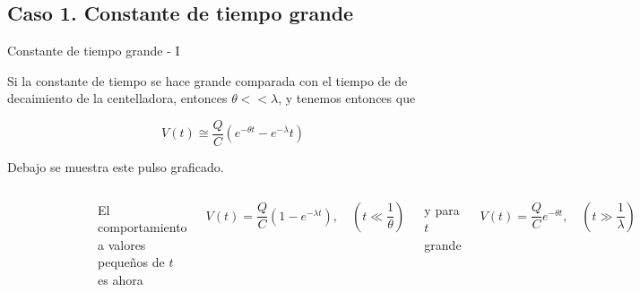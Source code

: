 \documentclass[a4paper,10pt]{beamer}
\begin{document}
\subsection{Caso 1. Constante de tiempo grande}

\begin{frame}{Constante de tiempo grande - I}
 
 Si la constante de tiempo se hace grande comparada con el tiempo de de decaimiento de 
 la centelladora, entonces $\theta << \lambda$, y tenemos entonces que 
 
 \begin{equation}
  V(t) \cong \frac{Q}{C}(e^{-\theta t} - e^{-\lambda} t)
 \end{equation}
 
 Debajo se muestra este pulso graficado. 

 \begin{columns}[c]
 
 \column{2in}
 
 \begin{figure}
  \center
  \includegraphics[scale=0.3]{fig45}
  \end{figure}

 
 \column{2in}
  El comportamiento a valores pequeños de $t$ es ahora
  
  \begin{equation*}
   V(t) = \frac{Q}{C}(1 - e^{-\lambda t}), \quad \left(t \ll \frac{1}{\theta} \right)
  \end{equation*}
  
  y para $t$ grande 
  
  \begin{equation*}
   V(t) = \frac{Q}{C}e^{-\theta t}, \quad \left(t \gg \frac{1}{\lambda} \right)
  \end{equation*}
 
 \end{columns}

\end{frame}
\end{document}

